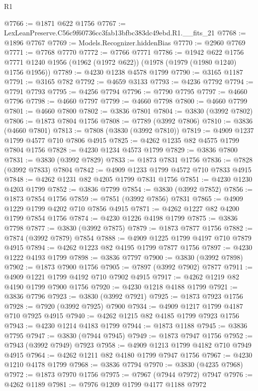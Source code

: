 \begin{lexlean}{R1}
\begin{coremodule}
@7766 := @1871 @622 @1756
@7767 := LexLeanPreserve.C56c9f60736cc3fab13bfbc383dc49ebd.R1.__fits_21
@7768 := @1896 @7767
@7769 := Models.Recognizer.hiddenBias
@7770 := @2960 @7769
@7771 := @7768 @7770
@7772 := @7766 @7771
@7786 := @1942
    @622
    @1756
    @7771
    @1240
    @1956
    (@1962 (@1972 @622))
    (@1978 (@1979 (@1980 @1240) @1756 @1956))
@7789 := @4230 @1238 @4578 @1799
@7790 := @3165 @1187
@7791 := @3165 @782
@7792 := @4659 @3133
@7793 := @4236 @7792
@7794 := @7791 @7793
@7795 := @4256 @7794
@7796 := @7790 @7795
@7797 := @4660 @7796
@7798 := @4660 @7797
@7799 := @4660 @7798
@7800 := @4660 @7799
@7801 := @4660 @7800
@7802 := @3836 @7801
@7804 := @3830 (@3992 @7802)
@7806 := @1873 @7804 @1756
@7808 := @7789 (@3992 @7806)
@7810 := @3836 (@4660 @7801)
@7813 := @7808 (@3830 (@3992 @7810))
@7819 := @4909 @1237 @1799 @4577 @710 @7806 @4915
@7825 := @4262 @1235 @82 @4575 @1799 @7804 @1756
@7828 := @4230 @1234 @4573 @1799
@7829 := @3836 @7800
@7831 := @3830 (@3992 @7829)
@7833 := @1873 @7831 @1756
@7836 := @7828 (@3992 @7833) @7804
@7842 := @4909 @1233 @1799 @4572 @710 @7833 @4915
@7848 := @4262 @1231 @82 @4205 @1799 @7831 @1756
@7851 := @4230 @1230 @4203 @1799
@7852 := @3836 @7799
@7854 := @3830 (@3992 @7852)
@7856 := @1873 @7854 @1756
@7859 := @7851 (@3992 @7856) @7831
@7865 := @4909 @1229 @1799 @4202 @710 @7856 @4915
@7871 := @4262 @1227 @82 @4200 @1799 @7854 @1756
@7874 := @4230 @1226 @4198 @1799
@7875 := @3836 @7798
@7877 := @3830 (@3992 @7875)
@7879 := @1873 @7877 @1756
@7882 := @7874 (@3992 @7879) @7854
@7888 := @4909 @1225 @1799 @4197 @710 @7879 @4915
@7894 := @4262 @1223 @82 @4195 @1799 @7877 @1756
@7897 := @4230 @1222 @4193 @1799
@7898 := @3836 @7797
@7900 := @3830 (@3992 @7898)
@7902 := @1873 @7900 @1756
@7905 := @7897 (@3992 @7902) @7877
@7911 := @4909 @1221 @1799 @4192 @710 @7902 @4915
@7917 := @4262 @1219 @82 @4190 @1799 @7900 @1756
@7920 := @4230 @1218 @4188 @1799
@7921 := @3836 @7796
@7923 := @3830 (@3992 @7921)
@7925 := @1873 @7923 @1756
@7928 := @7920 (@3992 @7925) @7900
@7934 := @4909 @1217 @1799 @4187 @710 @7925 @4915
@7940 := @4262 @1215 @82 @4185 @1799 @7923 @1756
@7943 := @4230 @1214 @4183 @1799
@7944 := @1873 @1188
@7945 := @3836 @7795
@7947 := @3830 (@7944 @7945)
@7949 := @1873 @7947 @1756
@7952 := @7943 (@3992 @7949) @7923
@7958 := @4909 @1213 @1799 @4182 @710 @7949 @4915
@7964 := @4262 @1211 @82 @4180 @1799 @7947 @1756
@7967 := @4230 @1210 @4178 @1799
@7968 := @3836 @7794
@7970 := @3830 (@4235 @7968)
@7972 := @1873 @7970 @1756
@7975 := @7967 (@7944 @7972) @7947
@7976 := @4262 @1189
@7981 := @7976 @1209 @1799 @4177 @1188 @7972

\end{coremodule}
\end{lexlean}
